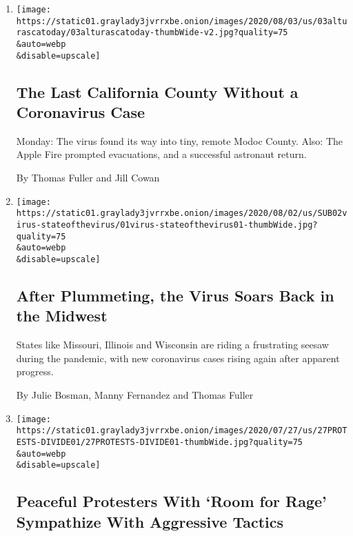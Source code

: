 \begin{enumerate}
\def\labelenumi{\arabic{enumi}.}
\item
  \href{/2020/08/03/us/california-coronavirus-modoc-county.html}{}

  \texttt{[image: https://static01.graylady3jvrrxbe.onion/images/2020/08/03/us/03alturascatoday/03alturascatoday-thumbWide-v2.jpg?quality=75\\\&auto=webp\\\&disable=upscale]}

  \hypertarget{the-last-california-county-without-a-coronavirus-case}{%
  \subsection{The Last California County Without a Coronavirus
  Case}\label{the-last-california-county-without-a-coronavirus-case}}

  Monday: The virus found its way into tiny, remote Modoc County. Also:
  The Apple Fire prompted evacuations, and a successful astronaut
  return.

  By Thomas Fuller and Jill Cowan
\item
  \href{/2020/08/01/us/coronavirus-midwest-cases-deaths.html}{}

  \texttt{[image: https://static01.graylady3jvrrxbe.onion/images/2020/08/02/us/SUB02virus-stateofthevirus/01virus-stateofthevirus01-thumbWide.jpg?quality=75\\\&auto=webp\\\&disable=upscale]}

  \hypertarget{after-plummeting-the-virus-soars-back-in-the-midwest}{%
  \subsection{After Plummeting, the Virus Soars Back in the
  Midwest}\label{after-plummeting-the-virus-soars-back-in-the-midwest}}

  States like Missouri, Illinois and Wisconsin are riding a frustrating
  seesaw during the pandemic, with new coronavirus cases rising again
  after apparent progress.

  By Julie Bosman, Manny Fernandez and Thomas Fuller
\item
  \href{/2020/07/27/us/protests-divisions-blm.html}{}

  \texttt{[image: https://static01.graylady3jvrrxbe.onion/images/2020/07/27/us/27PROTESTS-DIVIDE01/27PROTESTS-DIVIDE01-thumbWide.jpg?quality=75\\\&auto=webp\\\&disable=upscale]}

  \hypertarget{peaceful-protesters-with-room-for-rage-sympathize-with-aggressive-tactics}{%
  \subsection{Peaceful Protesters With `Room for Rage' Sympathize With
  Aggressive
  Tactics}\label{peaceful-protesters-with-room-for-rage-sympathize-with-aggressive-tactics}}


\end{enumerate}
